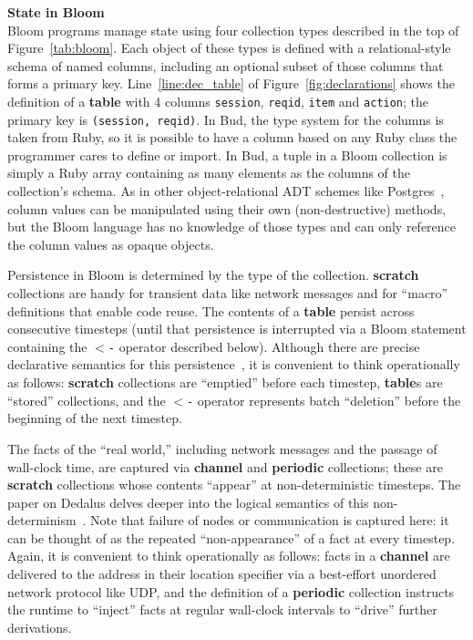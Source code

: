 \vspace{9pt}\noindent\textbf{State in Bloom}\\
Bloom programs manage state using four collection types described in
the top of Figure~\ref{tab:bloom}. Each object of these types is defined with a
relational-style schema of named columns, including an optional subset of those
columns that forms a primary key.  Line~\ref{line:dec_table} of
Figure~\ref{fig:declarations} shows the definition of a \textbf{table} with 4
columns \texttt{session}, \texttt{reqid}, \texttt{item} and \texttt{action}; the
primary key is \texttt{(session, reqid)}. In Bud, the type system for the
columns is taken from Ruby, so it is possible to have a column based on any Ruby
class the programmer cares to define or import.  In Bud, a tuple in a Bloom
collection is simply a Ruby array containing as many elements as the columns of
the collection's schema.  As in other object-relational ADT schemes like
Postgres~\cite{postgres-adt}, column values can be manipulated using their own
(non-destructive) methods, but the Bloom language has no knowledge of those
types and can only reference the column values as opaque objects.

Persistence in Bloom is determined by the type of the collection.
\textbf{scratch} collections are handy for transient data like network messages
and for ``macro'' definitions that enable code reuse. The contents of a
\textbf{table} persist across consecutive timesteps (until that persistence is
interrupted via a Bloom statement containing the \texttt{$<$-} operator
described below). Although there are precise declarative semantics for this
persistence~\cite{dedalus}, it is convenient to think operationally as
follows: \textbf{scratch} collections are ``emptied'' before each timestep,
\textbf{table}s are ``stored'' collections, and the \texttt{$<$-} operator
represents batch ``deletion'' before the beginning of the next timestep.

The facts of the ``real world,'' including network messages and the passage of
wall-clock time, are captured via \textbf{channel} and \textbf{periodic}
collections; these are \textbf{scratch} collections whose contents ``appear''
at non-deterministic timesteps. 
The paper on Dedalus delves deeper into the logical semantics of this
non-determinism~\cite{dedalus}.  Note that failure of nodes or
communication is captured here: it can be thought of as the repeated
``non-appearance'' of a fact at every timestep.  Again, it is convenient to
think operationally as follows: facts in a \textbf{channel} are delivered to
the address in their location specifier via a best-effort unordered network
protocol like UDP, and the definition of a \textbf{periodic} collection
instructs the runtime to ``inject'' facts at regular wall-clock intervals to
``drive'' further derivations.

